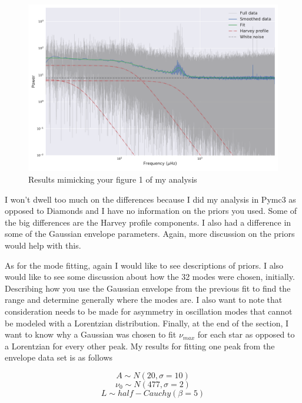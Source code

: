 \documentclass[10pt,a4paper]{article}
\begin{document}
		\begin{figure}
			\centering
			\label{envfit}
			\includegraphics[width=\linewidth]{figs/psd_fit}
			\caption{Results mimicking your figure 1 of my analysis}
		\end{figure}
	
		I won't dwell too much on the differences because I did my analysis in Pymc3 as opposed to Diamonds and I have no information on the priors you used. Some of the big differences are the Harvey profile components. I also had a difference in some of the Gaussian envelope parameters. Again, more discussion on the priors would help with this. 
		
		As for the mode fitting, again I would like to see descriptions of priors. I also would like to see some discussion about how the 32 modes were chosen, initially. Describing how you use the Gaussian envelope from the previous fit to find the range and determine generally where the modes are. I also want to note that consideration needs to be made for asymmetry in oscillation modes that cannot be modeled with a Lorentzian distribution. Finally, at the end of the section, I want to know why a Gaussian was chosen to fit $\nu_{max}$ for each star as opposed to a Lorentzian for every other peak. My results for fitting one peak from the envelope data set is as follows
		
		$$ A \sim N(20, \sigma=10) $$
		$$ \nu_0 \sim N(477, \sigma=2) $$
		$$ L \sim half-Cauchy(\beta=5) $$
		
\end{document}

